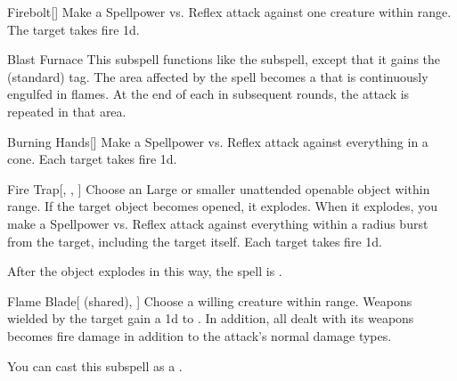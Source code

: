 \begin{ability}[\nth{1}]{Firebolt}[]
Make a Spellpower vs. Reflex attack against one creature within \rngmed range.
\hit The target takes fire  \plus1d.
\end{ability}
\vspace{0.25em}


\begin{ability}[\nth{2}]{Blast Furnace}
This subspell functions like the  subspell, except that it gains the  (standard) tag.
The area affected by the spell becomes a  that is continuously engulfed in flames.
At the end of each  in subsequent rounds, the attack is repeated in that area.
\end{ability}
\vspace{0.25em}


\begin{ability}[\nth{2}]{Burning Hands}[]
Make a Spellpower vs. Reflex attack against everything in a \arealarge cone.
\hit Each target takes fire  \minus1d.
\end{ability}
\vspace{0.25em}


\begin{ability}[\nth{3}]{Fire Trap}[, , ]
Choose an Large or smaller unattended openable object within \rngclose range.
If the target object becomes opened, it explodes.
When it explodes, you make a Spellpower vs. Reflex attack against everything within a \areamed radius burst from the target, including the target itself.
\hit Each target takes fire  \minus1d.

After the object explodes in this way, the spell is .
\end{ability}
\vspace{0.25em}


\begin{ability}[\nth{3}]{Flame Blade}[ (shared), ]
Choose a willing creature within \rngclose range.
Weapons wielded by the target gain a \plus1d  to .
In addition, all  dealt with its weapons becomes fire damage in addition to the attack's normal damage types.

You can cast this subspell as a .
\end{ability}
\vspace{0.25em}


